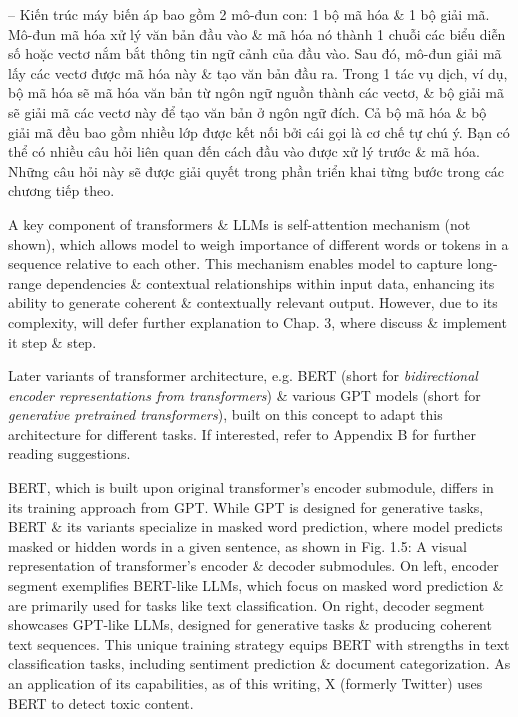 \documentclass{article}
\begin{document}
\begin{itemize}
\begin{itemize}
		-- Kiến trúc máy biến áp bao gồm 2 mô-đun con: 1  bộ mã hóa \& 1  bộ giải mã. Mô-đun mã hóa xử lý văn bản đầu vào \& mã hóa nó thành 1  chuỗi các biểu diễn số hoặc vectơ nắm bắt thông tin ngữ cảnh của đầu vào. Sau đó, mô-đun giải mã lấy các vectơ được mã hóa này \& tạo văn bản đầu ra. Trong 1  tác vụ dịch, ví dụ, bộ mã hóa sẽ mã hóa văn bản từ ngôn ngữ nguồn thành các vectơ, \& bộ giải mã sẽ giải mã các vectơ này để tạo văn bản ở ngôn ngữ đích. Cả bộ mã hóa \& bộ giải mã đều bao gồm nhiều lớp được kết nối bởi cái gọi là cơ chế tự chú ý. Bạn có thể có nhiều câu hỏi liên quan đến cách đầu vào được xử lý trước \& mã hóa. Những câu hỏi này sẽ được giải quyết trong phần triển khai từng bước trong các chương tiếp theo.
		
		A key component of transformers \& LLMs is self-attention mechanism (not shown), which allows model to weigh importance of different words or tokens in a sequence relative to each other. This mechanism enables model to capture long-range dependencies \& contextual relationships within input data, enhancing its ability to generate coherent \& contextually relevant output. However, due to its complexity, will defer further explanation to Chap. 3, where discuss \& implement it step \& step.
		
		Later variants of transformer architecture, e.g. BERT (short for {\it bidirectional encoder representations from transformers}) \& various GPT models (short for {\it generative pretrained transformers}), built on this concept to adapt this architecture for different tasks. If interested, refer to Appendix B for further reading suggestions.
		
		BERT, which is built upon original transformer's encoder submodule, differs in its training approach from GPT. While GPT is designed for generative tasks, BERT \& its variants specialize in masked word prediction, where model predicts masked or hidden words in a given sentence, as shown in {\sf Fig. 1.5: A visual representation of transformer's encoder \& decoder submodules. On left, encoder segment exemplifies BERT-like LLMs, which focus on masked word prediction \& are primarily used for tasks like text classification. On right, decoder segment showcases GPT-like LLMs, designed for generative tasks \& producing coherent text sequences.} This unique training strategy equips BERT with strengths in text classification tasks, including sentiment prediction \& document categorization. As an application of its capabilities, as of this writing, X (formerly Twitter) uses BERT to detect toxic content.
		

\end{itemize}
\end{itemize}
\end{document}

